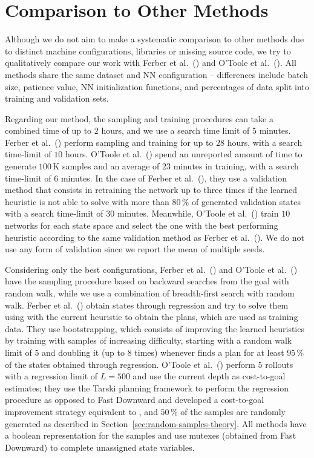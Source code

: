 \chapter{Comparison to Other Methods}
\label{sec:comparison}

Although we do not aim to make a systematic comparison to other methods due to distinct machine configurations, libraries or missing source code, we try to qualitatively compare our work with Ferber et al.~(\citeyear{Ferber.etal/2022}) and O'Toole et al.~(\citeyear{OToole/2022}). All methods share the same dataset and NN configuration -- differences include batch size, patience value, NN initialization functions, and percentages of data split into training and validation sets.

Regarding our method, the sampling and training procedures can take a combined time of up to $2$ hours, and we use a search time limit of $5$ minutes. Ferber et al.~(\citeyear{Ferber.etal/2022}) perform sampling and training for up to $28$ hours, with a search time-limit of $10$ hours. O'Toole et al.~(\citeyear{OToole/2022}) spend an unreported amount of time to generate $100$\,K samples and an average of $23$ minutes in training, with a search time-limit of $6$ minutes. In the case of Ferber et al.~(\citeyear{Ferber.etal/2022}), they use a validation method that consists in retraining the network up to three times if the learned heuristic is not able to solve with \gbfs more than $80\,\%$ of generated validation states with a search time-limit of $30$ minutes. Meanwhile, O'Toole et al.~(\citeyear{OToole/2022}) train $10$ networks for each state space and select the one with the best performing heuristic according to the same validation method as Ferber et al.~(\citeyear{Ferber.etal/2022}). We do not use any form of validation since we report the mean of multiple seeds.

Considering only the best configurations, Ferber et al.~(\citeyear{Ferber.etal/2022}) and O'Toole et al.~(\citeyear{OToole/2022}) have the sampling procedure based on backward searches from the goal with random walk, while we use a combination of breadth-first search with random walk. Ferber et al.~(\citeyear{Ferber.etal/2022}) obtain states through regression and try to solve them using \gbfs with the current heuristic to obtain the plans, which are used as training data. They use bootstrapping, which consists of improving the learned heuristics by training with samples of increasing difficulty, starting with a random walk limit of $5$ and doubling it (up to $8$ times) whenever \gbfs finds a plan for at least $95\,\%$ of the states obtained through regression. O'Toole et al.~(\citeyear{OToole/2022}) perform $5$ rollouts with a regression limit of $L=500$ and use the current depth as cost-to-goal estimates; they use the Tarski planning framework to perform the regression procedure as opposed to Fast Downward and developed a cost-to-goal improvement strategy equivalent to \hmin, and $50\,\%$ of the samples are randomly generated as described in Section~\ref{sec:random-samples-theory}. All methods have a boolean representation for the samples and use mutexes (obtained from Fast Downward) to complete unassigned state variables.

